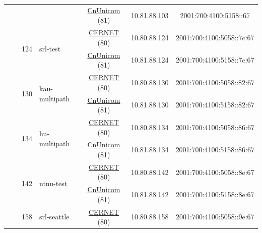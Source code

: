 \begin{small}
\begin{center}
\begin{longtable}{|c|c|c|c|c|c|c|c|}
  &  & \multicolumn{2}{|c|}{} & \multicolumn{2}{|c|}{\tiny{\href{http://www.chinaunicom.com}{CnUnicom} (81)}} & \tiny{10.81.88.103} & \tiny{2001:700:4100:5158::67} \\* \cline{3-3}\cline{4-4}\cline{5-5}\cline{6-6}\cline{7-7}\cline{8-8}
  &  & \multirow{2}{*}{\tiny{124}} & \multicolumn{1}{|l|}{\multirow{2}{*}{\tiny{srl-test}}} & \multicolumn{2}{|c|}{\tiny{\href{http://www.cernet.edu.cn}{CERNET} (80)}} & \tiny{10.80.88.124} & \tiny{2001:700:4100:5058::7c:67} \\* \cline{5-5}\cline{6-6}\cline{7-7}\cline{8-8}
  &  &  &  & \multicolumn{2}{|c|}{\tiny{\href{http://www.chinaunicom.com}{CnUnicom} (81)}} & \tiny{10.81.88.124} & \tiny{2001:700:4100:5158::7c:67} \\* \cline{3-3}\cline{4-4}\cline{5-5}\cline{6-6}\cline{7-7}\cline{8-8}
  &  & \multirow{2}{*}{\tiny{130}} & \multicolumn{1}{|l|}{\multirow{2}{*}{\tiny{kau-multipath}}} & \multicolumn{2}{|c|}{\tiny{\href{http://www.cernet.edu.cn}{CERNET} (80)}} & \tiny{10.80.88.130} & \tiny{2001:700:4100:5058::82:67} \\* \cline{5-5}\cline{6-6}\cline{7-7}\cline{8-8}
  &  &  &  & \multicolumn{2}{|c|}{\tiny{\href{http://www.chinaunicom.com}{CnUnicom} (81)}} & \tiny{10.81.88.130} & \tiny{2001:700:4100:5158::82:67} \\* \cline{3-3}\cline{4-4}\cline{5-5}\cline{6-6}\cline{7-7}\cline{8-8}
  &  & \multirow{2}{*}{\tiny{134}} & \multicolumn{1}{|l|}{\multirow{2}{*}{\tiny{hu-multipath}}} & \multicolumn{2}{|c|}{\tiny{\href{http://www.cernet.edu.cn}{CERNET} (80)}} & \tiny{10.80.88.134} & \tiny{2001:700:4100:5058::86:67} \\* \cline{5-5}\cline{6-6}\cline{7-7}\cline{8-8}
  &  &  &  & \multicolumn{2}{|c|}{\tiny{\href{http://www.chinaunicom.com}{CnUnicom} (81)}} & \tiny{10.81.88.134} & \tiny{2001:700:4100:5158::86:67} \\* \cline{3-3}\cline{4-4}\cline{5-5}\cline{6-6}\cline{7-7}\cline{8-8}
  &  & \multirow{2}{*}{\tiny{142}} & \multicolumn{1}{|l|}{\multirow{2}{*}{\tiny{ntnu-test}}} & \multicolumn{2}{|c|}{\tiny{\href{http://www.cernet.edu.cn}{CERNET} (80)}} & \tiny{10.80.88.142} & \tiny{2001:700:4100:5058::8e:67} \\* \cline{5-5}\cline{6-6}\cline{7-7}\cline{8-8}
  &  &  &  & \multicolumn{2}{|c|}{\tiny{\href{http://www.chinaunicom.com}{CnUnicom} (81)}} & \tiny{10.81.88.142} & \tiny{2001:700:4100:5158::8e:67} \\* \cline{3-3}\cline{4-4}\cline{5-5}\cline{6-6}\cline{7-7}\cline{8-8}
  &  & \multirow{2}{*}{\tiny{158}} & \multicolumn{1}{|l|}{\multirow{2}{*}{\tiny{srl-seattle}}} & \multicolumn{2}{|c|}{\tiny{\href{http://www.cernet.edu.cn}{CERNET} (80)}} & \tiny{10.80.88.158} & \tiny{2001:700:4100:5058::9e:67} \\* \cline{5-5}\cline{6-6}\cline{7-7}\cline{8-8}

\end{longtable}
\end{center}
\end{small}
